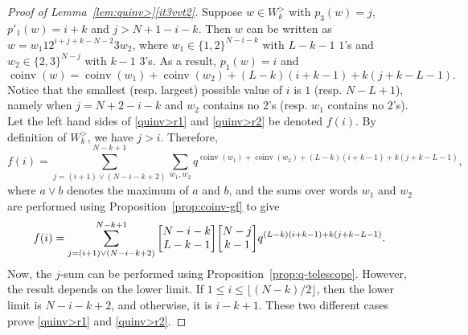 \documentclass[ALCO,Unicode]{cedram}
\DeclareMathOperator{\coinv}{coinv}
\newcommand{\qbinom}[2]{\bgroup\renewcommand*{\arraystretch}{1}\begin{bmatrix} #1 \\ #2\end{bmatrix} \egroup}
\begin{document}
\begin{proof}[Proof of Lemma~\ref{lem:quinv>}\ref{it3vvt2}]
Suppose $w \in  W_k^>$ with $p_3(w) = j$, $p'_1(w) = i+k$ and $j > N+1 - i-k$. Then
$w$ can be written as $w = w_1 1 2^{i+j+k-N-2} 3 w_2$, where $w_1 \in \{1,2\}^{N-i-k}$ with $L-k-1$ $1$'s
and $w_2 \in \{2,3\}^{N-j}$ with $k-1$ $3$'s. As a result, $p_1(w) = i$ and
\[
\coinv(w) = \coinv(w_1) + \coinv(w_2) + (L-k)(i+k-1) + k(j+k-L-1).
\]
Notice that the smallest (resp. largest) possible value of $i$ is $1$ (resp. $N-L+1$), namely when 
$j = N+2-i-k$ and $w_2$ contains no $2$'s
(resp. $w_1$ contains no $2$'s).
Let the left hand sides of \eqref{quinv>r1} and \eqref{quinv>r2} be denoted $f(i)$.
By definition of $W_k^>$, we have $j > i$. Therefore,
\[
f(i) = \sum_{j=(i+1) \vee (N-i-k+2)}^{N-k+1} \sum_{w_1,w_2} q^{\coinv(w_1) + \coinv(w_2) + (L-k)(i+k-1) + k(j+k-L-1)},
\]
where $a \vee b$ denotes the maximum of $a$ and $b$,
and the sums over words $w_1$ and $w_2$ are performed using Proposition~\ref{prop:coinv-gf} to give
\[
f(i) = \sum_{j=(i+1) \vee (N-i-k+2)}^{N-k+1} \qbinom {N-i-k}{L-k-1} \qbinom{N-j}{k-1} q^{ (L-k)(i+k-1) + k(j+k-L-1)}.
\]
Now, the $j$-sum can be performed using Proposition~\ref{prop:q-telescope}. However, the result depends on 
the lower limit. If $1 \leq i \leq \lfloor (N-k)/2 \rfloor$, then the lower limit is $N-i-k+2$, and otherwise,
it is $i-k+1$. These two different cases prove \eqref{quinv>r1} and \eqref{quinv>r2}.
\end{proof}
\end{document}
